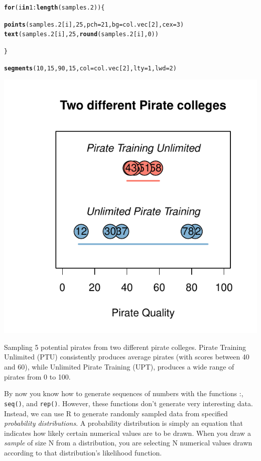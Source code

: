 \documentclass{tufte-book}\usepackage[]{graphicx}\usepackage[]{color}
\makeatletter
\def\maxwidth{ %
  \ifdim\Gin@nat@width>\linewidth
    \linewidth
  \else
    \Gin@nat@width
  \fi
}
\newcommand{\hlnum}[1]{\textcolor[rgb]{0.686,0.059,0.569}{#1}}%
\newcommand{\hlopt}[1]{\textcolor[rgb]{0,0,0}{#1}}%
\newcommand{\hlstd}[1]{\textcolor[rgb]{0.345,0.345,0.345}{#1}}%
\newcommand{\hlkwa}[1]{\textcolor[rgb]{0.161,0.373,0.58}{\textbf{#1}}}%
\newcommand{\hlkwc}[1]{\textcolor[rgb]{0.333,0.667,0.333}{#1}}%
\newcommand{\hlkwd}[1]{\textcolor[rgb]{0.737,0.353,0.396}{\textbf{#1}}}%
\newenvironment{kframe}{%
 \def\at@end@of@kframe{}%
 \ifinner\ifhmode%
  \def\at@end@of@kframe{\end{minipage}}%
  \begin{minipage}{\columnwidth}%
 \fi\fi%
 \def\FrameCommand##1{\hskip\@totalleftmargin \hskip-\fboxsep
 \colorbox{shadecolor}{##1}\hskip-\fboxsep
     \hskip-\linewidth \hskip-\@totalleftmargin \hskip\columnwidth}%
 \MakeFramed {\advance\hsize-\width
   \@totalleftmargin\z@ \linewidth\hsize
   \@setminipage}}%
 {\par\unskip\endMakeFramed%
 \at@end@of@kframe}
\newenvironment{knitrout}{}{} %
\makeatother
\begin{document}
\begin{marginfigure}
\begin{tiny}
\begin{knitrout}
\begin{kframe}
\begin{alltt}
\hlkwa{for}\hlstd{(i} \hlkwa{in} \hlnum{1}\hlopt{:}\hlkwd{length}\hlstd{(samples.2)) \{}

  \hlkwd{points}\hlstd{(samples.2[i],} \hlnum{25}\hlstd{,} \hlkwc{pch} \hlstd{=} \hlnum{21}\hlstd{,} \hlkwc{bg} \hlstd{= col.vec[}\hlnum{2}\hlstd{],} \hlkwc{cex} \hlstd{=} \hlnum{3}\hlstd{)}
  \hlkwd{text}\hlstd{(samples.2[i],} \hlnum{25}\hlstd{,} \hlkwd{round}\hlstd{(samples.2[i],} \hlnum{0}\hlstd{))}

\hlstd{\}}

\hlkwd{segments}\hlstd{(}\hlnum{10}\hlstd{,} \hlnum{15}\hlstd{,} \hlnum{90}\hlstd{,} \hlnum{15}\hlstd{,} \hlkwc{col} \hlstd{= col.vec[}\hlnum{2}\hlstd{],} \hlkwc{lty} \hlstd{=} \hlnum{1}\hlstd{,} \hlkwc{lwd} \hlstd{=} \hlnum{2}\hlstd{)}
\end{alltt}
\end{kframe}
\includegraphics[width=\maxwidth]{figure/unnamed-chunk-38-1} 

\end{knitrout}
\end{tiny}
\caption{Sampling 5 potential pirates from two different pirate colleges. Pirate Training Unlimited (PTU) consistently produces average pirates (with scores between 40 and 60), while Unlimited Pirate Training (UPT), produces a wide range of pirates from 0 to 100.}
\label{fig:piratecollege}
\end{marginfigure}
By now you know how to generate sequences of numbers with the functions :, \texttt{seq()}, and \texttt{rep()}. However, these functions don't generate very interesting data. Instead, we can use R to generate randomly sampled data from specified \textit{probability distributions}. A probability distribution is simply an equation that indicates how likely certain numerical values are to be drawn. When you draw a \textit{sample} of size N from a distribution, you are selecting N numerical values drawn according to that distribution's likelihood function.
\end{document}
